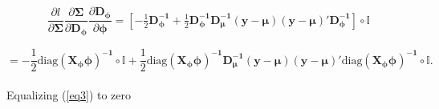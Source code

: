 \documentclass[useAMS,referee]{biom}
\begin{document}
\begin{equation*}
\begin{array}{l}
\dfrac{\partial l}{\partial \boldsymbol{\Sigma}} \dfrac{\partial \boldsymbol{\Sigma}}{\partial \mathbf{D_\phi}}\dfrac{\partial \mathbf{D_\phi}}{\partial \boldsymbol{\phi}}=[-\frac{1}{2}\mathbf{ D_\phi^{-1}}+\frac{1}{2}\mathbf{ D_\phi^{-1}D_\mu^{-1}}(\mathbf{y}-\boldsymbol{\mu})(\mathbf{y}-\boldsymbol{\mu})'\mathbf{ D_\phi^{-1}}]\circ \mathbb{I}\\~\\     
\end{array}
\end{equation*}
\begin{equation}\label{eq3}
= -\frac{1}{2}\mbox{diag}\mathbf{ (X_\phi \boldsymbol{\phi})^{-1}}\circ \mathbb{I}+\frac{1}{2}\mbox{diag}\mathbf{ (X_\phi \boldsymbol{\phi})^{-1}D_\mu^{-1}}(\mathbf{y}-\boldsymbol{\mu})(\mathbf{y}-\boldsymbol{\mu})'\mbox{diag}\mathbf{( X_\phi \boldsymbol{\phi})^{-1}}\circ \mathbb{I}.
\end{equation}\\
Equalizing (\ref{eq3}) to zero
\end{document}
